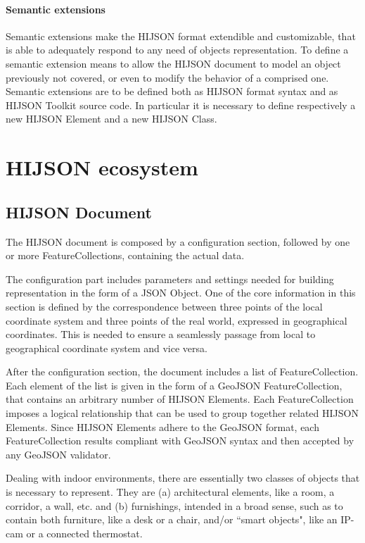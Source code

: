 \documentclass{sig-alternate}
\begin{document}
\paragraph{Semantic extensions} Semantic extensions make the HIJSON format
extendible and customizable, that is able to adequately respond to any need of
objects representation. To define a semantic extension means to allow the
HIJSON document to model an object previously not covered, or even to modify
the behavior of a comprised one. Semantic extensions are to be defined both as
HIJSON format syntax and as HIJSON Toolkit source code. In particular it is
necessary to define respectively a new HIJSON Element and a new HIJSON Class.


\section{HIJSON ecosystem}


\subsection{HIJSON Document}

The HIJSON document is composed by a configuration section, followed by one or
more FeatureCollections, containing the actual data.


The configuration part includes parameters and settings needed for building
representation in the form of a JSON Object. One of the core information in
this section is defined by the correspondence between three points of the
local coordinate system and three points of the real world, expressed in
geographical coordinates. This is needed to ensure a seamlessly passage from
local to geographical coordinate system and vice versa.

After the configuration section, the document includes a list of
FeatureCollection.  Each element of the list is given in the form of a GeoJSON
FeatureCollection, that contains an arbitrary number of HIJSON Elements. Each
FeatureCollection imposes a logical relationship that can be used to group
together related HIJSON Elements. Since HIJSON Elements adhere to the GeoJSON
format, each FeatureCollection results compliant with GeoJSON syntax and then
accepted by any GeoJSON validator.

Dealing with indoor environments, there are essentially two classes of objects
that is necessary to represent. They are (a) architectural elements, like a
room, a corridor, a wall, etc. and (b) furnishings, intended in a broad sense,
such as to contain both furniture, like a desk or a chair, and/or ``smart
objects", like an IP-cam or a connected thermostat.
\end{document}
